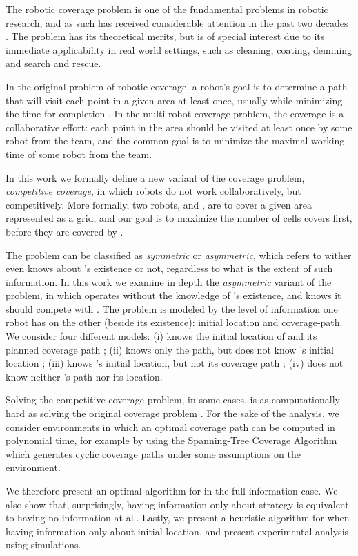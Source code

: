 The robotic coverage problem is one of the fundamental problems in robotic research, and as such has received considerable attention in the past two decades \cite{galceran2013survey}. The problem has its theoretical merits, but is of special interest due to its immediate applicability in real world settings, such as cleaning, coating, demining and search and rescue. 

In the original problem of robotic coverage, a robot's goal is to determine a path that will visit each point in a given area at least once, usually while minimizing the time for completion \cite{galceran2013survey}. In the multi-robot coverage problem, the coverage is a collaborative effort: each point in the area should be visited at least once by some robot from the team, and the common goal is to minimize the maximal working time of some robot from the team. 

In this work we formally define a new variant of the coverage problem, {\em competitive coverage}, in which robots do not work collaboratively, but competitively. More formally, two robots, \rob and \opp, are to cover a given area represented as a grid, and our goal is to maximize the number of cells \rob covers first, before they are covered by \opp.

The problem can be classified as {\em symmetric} or {\em asymmetric}, which refers to wither \opp even knows about \rob's existence or not, regardless to what is the extent of such information. In this work we examine in depth the {\em asymmetric} variant of the problem, in which \opp operates without the knowledge of \rob's existence, and \rob knows it should compete with \opp. The problem is modeled by the level of information one robot has on the other (beside its existence): initial location and coverage-path. We consider four different models: (i) \rob knows the initial location of \opp and its planned coverage path ; (ii) \rob knows only the path, but does not know \opp's initial location ; (iii) \rob knows \opp's initial location, but not its coverage path ; (iv) \rob does not know neither \opp's path nor its location.

Solving the competitive coverage problem, in some cases, is as computationally hard as solving the original coverage problem \cite{arkin2000approximation}. For the sake of the analysis, we consider environments in which an optimal coverage path can be computed in polynomial time, for example by using the Spanning-Tree Coverage Algorithm \cite{gabriely2001spanning} which generates cyclic coverage paths under some assumptions on the environment. 

We therefore present an optimal algorithm for \opp in the full-information case. We also show that, surprisingly, having information only about strategy is equivalent to having no information at all. Lastly, we present a heuristic algorithm for when having information only about initial location, and present experimental analysis using simulations. 